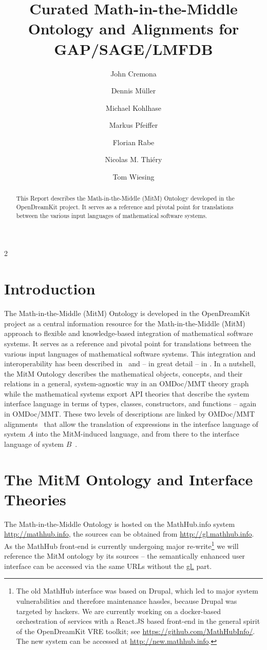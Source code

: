 \documentclass{deliverablereport}
\title{Curated Math-in-the-Middle Ontology and Alignments for GAP/SAGE/LMFDB}
\author{John Cremona}
\author{Dennis M\"uller}
\author{Michael Kohlhase}
\author{Markus Pfeiffer}
\author{Florian Rabe}
\author{Nicolas M. Thiéry}
\author{Tom Wiesing}
\begin{document}
\maketitle
\begin{abstract}
  This Report describes the Math-in-the-Middle (MitM) Ontology developed in the
  OpenDreamKit project. It serves as a reference and pivotal point for translations
  between the various input languages of mathematical software systems. 
\end{abstract}
\newpage\setcounter{tocdepth}2\tableofcontents\newpage

\section{Introduction}
The Math-in-the-Middle (MitM) Ontology is developed in the OpenDreamKit project as a
central information resource for the Math-in-the-Middle (MitM) approach to flexible and
knowledge-based integration of mathematical software systems. It serves as a reference and
pivotal point for translations between the various input languages of mathematical
software systems. This integration and interoperability has been described
in~\cite{DehKohKon:iop16,WieKohRab:vtuimkb17,KohMuePfe:kbimss17} and -- in great detail --
in \cite{ODK-D6.5}. In a nutshell, the MitM Ontology describes the mathematical objects,
concepts, and their relations in a general, system-agnostic way in an OMDoc/MMT theory
graph while the mathematical systems export API theories that describe the system
interface language in terms of types, classes, constructors, and functions -- again in
OMDoc/MMT. These two levels of descriptions are linked by OMDoc/MMT
alignments~\cite{MueGauKal:cacfms17} that allow the translation of expressions in the
interface language of system $A$ into the MitM-induced language, and from there to the
interface language of system $B$~\cite{MueRoYuRa:abtafs17}.

\section{The MitM Ontology and Interface Theories}

The Math-in-the-Middle Ontology is hosted on the MathHub.info system
\url{http://mathhub.info}, the sources can be obtained from
\url{http://gl.mathhub.info}. As the MathHub front-end is currently undergoing major
re-write\footnote{The old MathHub interface was based on Drupal, which led to major system
  vulnerabilities and therefore maintenance hassles, because Drupal was targeted by
  hackers. We are currently working on a docker-based orchestration of services with a
  React.JS based front-end in the general spirit of the OpenDreamKit VRE toolkit; see
  \url{https://github.com/MathHubInfo/}. The new system can be accessed at
  \url{http://new.mathhub.info}.} we will reference the MitM ontology by its sources --
the semantically enhanced user interface can be accessed via the same URLs without the
\url{gl.} part.
\end{document}
